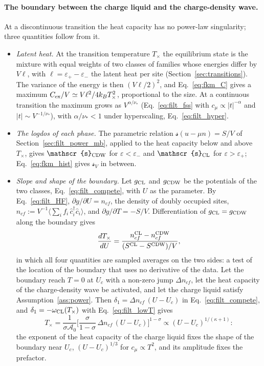 \documentclass[10pt,a4paper]{article}
\theoremstyle{plain}
\newcommand{\cA}{{\mathcal{A}_0}}   %
\newcommand{\lndos}{{logdos}}  %
\newcommand{\lds}{\mathscr{s}}  %
\begin{document}
\paragraph{The boundary between the charge liquid and the charge-density
wave.} At a discontinuous transition the heat capacity has no power-law
singularity; three quantities follow from it.
\begin{itemize}\setlength{\itemsep}{2pt}
\item \emph{Latent heat.} At the transition temperature $T_\times$ the
  equilibrium state is the mixture with equal weights of two classes of
  families whose energies differ by $V\ell$, with
  $\ell=\varepsilon_+-\varepsilon_-$ the latent heat per site
  (Section~\ref{sec:transitions}). The variance of the energy is then
  $(V\ell/2)^{2}$, and Eq.~\eqref{eq:fkm_C} gives a maximum
  $C_{\rm ex}/V\simeq V\ell^{2}/4k_BT_\times^{2}$, proportional to the size.
  At a continuous transition the maximum grows as $V^{\alpha/\nu_*}$
  (Eq.~\eqref{eq:filt_fss} with $c_\mu\propto|t|^{-\alpha}$ and
  $|t|\sim V^{-1/\nu_*}$), with $\alpha/\nu_*<1$ under hyperscaling,
  Eq.~\eqref{eq:filt_hyper}.
\item \emph{The \lndos{} of each phase.} The parametric relation
  $\lds(u-\mu n)=S/V$ of Section~\ref{sec:filt_power_mb}, applied to the
  heat capacity below and above $T_\times$, gives $\lds_{\rm CDW}$ for
  $\varepsilon<\varepsilon_-$ and $\lds_{\rm CL}$ for $\varepsilon>\varepsilon_+$;
  Eq.~\eqref{eq:fkm_hist} gives $\lds_V$ in between.
\item \emph{Slope and shape of the boundary.} Let $g_{\rm CL}$ and
  $g_{\rm CDW}$ be the potentials of the two classes,
  Eq.~\eqref{eq:filt_compete}, with $U$ as the parameter. By
  Eq.~\eqref{eq:filt_HF}, $\partial g/\partial U=n_{cf}$, the density of
  doubly occupied sites,
  $n_{cf}:=V^{-1}\langle\sum_if_i\,\hat c_i^{\dagger}\hat c_i\rangle$, and
  $\partial g/\partial T=-S/V$. Differentiation of
  $g_{\rm CL}=g_{\rm CDW}$ along the boundary gives
  \begin{equation}\label{eq:fkm_cc}
    \frac{dT_\times}{dU}=\frac{n_{cf}^{\rm CL}-n_{cf}^{\rm CDW}}{(S^{\rm CL}-S^{\rm CDW})/V} ,
  \end{equation}
  in which all four quantities are sampled averages on the two sides: a
  test of the location of the boundary that uses no derivative of the
  data. Let the boundary reach $T=0$ at $U_c$ with a non-zero jump
  $\Delta n_{cf}$, let the heat capacity of the charge-density wave be
  activated, and let the charge liquid satisfy Assumption~\ref{ass:power}.
  Then $\delta_1=\Delta n_{cf}\,(U-U_c)$ in Eq.~\eqref{eq:filt_compete}, and
  $\delta_1=-\omega_{\rm CL}(T_\times)$ with Eq.~\eqref{eq:filt_lowT} gives
  \[
    T_\times=\frac{1}{\sigma\cA}\Big[\frac{\sigma}{1-\sigma}\,\Delta n_{cf}\,(U-U_c)\Big]^{1-\sigma}
    \propto(U-U_c)^{1/(\kappa+1)} :
  \]
  the exponent of the heat capacity of the charge liquid fixes the shape of
  the boundary near $U_c$, $(U-U_c)^{1/3}$ for $c_\mu\propto T^{2}$, and its
  amplitude fixes the prefactor.
\end{itemize}
\end{document}
